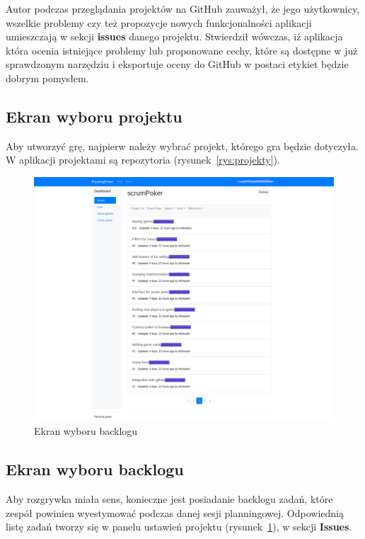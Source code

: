 Autor podczas przeglądania projektów na GitHub zauważył, że jego użytkownicy,
wszelkie problemy czy też propozycje nowych funkcjonalności aplikacji umieszczają
w sekcji \textbf{issues} danego projektu. Stwierdził wówczas, iż aplikacja która ocenia
istniejące problemy lub proponowane cechy, które są dostępne w już sprawdzonym narzędziu
i eksportuje oceny do GitHub w postaci etykiet będzie dobrym pomysłem.


\subsection{Ekran wyboru projektu}

Aby utworzyć grę, najpierw należy wybrać projekt, którego gra będzie dotyczyła.
W aplikacji projektami są repozytoria (rysunek~\ref{rys:projekty}).

\begin{figure}[h]
	\centering\includegraphics[width=\textwidth]{img/Issues.png}
	\caption{Ekran wyboru backlogu}\label{rys:issues}%
\end{figure}


\subsection{Ekran wyboru backlogu}

Aby rozgrywka miała sens, konieczne jest posiadanie backlogu zadań,
które zespół powinien wyestymować podczas danej sesji planningowej.
Odpowiednią listę zadań tworzy się w panelu ustawień projektu (rysunek~\ref{rys:issues}),
w sekcji \textbf{Issues}.

